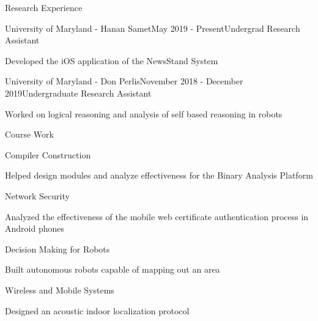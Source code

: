 \documentclass{resume} %
\begin{document}
\begin{rSection}{Research Experience}

\begin{rSubsection}{University of Maryland - Hanan Samet}{May 2019 - Present}{Undergrad Research Assistant}{}
\item Developed the iOS application of the NewsStand System
\end{rSubsection}

\begin{rSubsection}{University of Maryland - Don Perlis}{November 2018 - December 2019}{Undergraduate Research Assistant}{}
\item Worked on logical reasoning and analysis of self based reasoning in robots
\end{rSubsection}

\end{rSection}



\begin{rSection}{Course Work}

\begin{rSubsection}{Compiler Construction}{}{}{}
\item Helped design modules and analyze effectiveness for the Binary Analysis Platform
\end{rSubsection}

\begin{rSubsection}{Network Security}{}{}{}
\item Analyzed the effectiveness of the mobile web certificate authentication process in Android phones
\end{rSubsection}

\begin{rSubsection}{Decision Making for Robots}{}{}{}
\item Built autonomous robots capable of mapping out an area
\end{rSubsection}

\begin{rSubsection}{Wireless and Mobile Systems}{}{}{}
\item Designed an acoustic indoor localization protocol 
\end{rSubsection}
\end{rSection}
\end{document}

